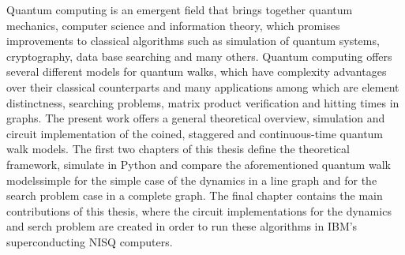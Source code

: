 \documentclass[../../dissertation.tex]{subfiles}
\begin{document}
Quantum computing is an emergent field that brings together quantum mechanics,
computer science and information theory, which promises improvements to
classical algorithms such as simulation of quantum systems, cryptography, data
base searching and many others. Quantum computing offers several different
models for quantum walks, which have complexity advantages over their classical
counterparts and many applications among which are element distinctness,
searching problems, matrix product verification and hitting times in graphs.
The present work offers a general theoretical overview, simulation and circuit
implementation of the coined, staggered and continuous-time quantum walk
models. The first two chapters of this thesis define the theoretical framework,
simulate in Python and compare the aforementioned quantum walk modelssimple for
the simple case of the dynamics in a line graph and for the search problem case
in a complete graph.  The final chapter contains the main contributions of this
thesis, where the circuit implementations for the dynamics and serch problem
are created in order to run these algorithms in IBM's superconducting NISQ
computers.
\end{document}
